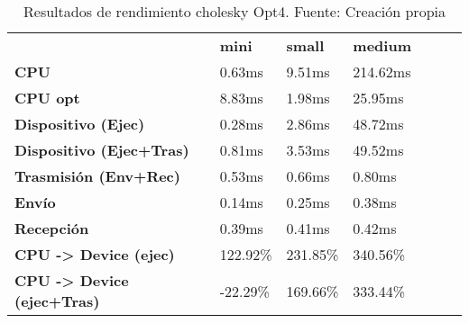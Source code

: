 \begin{table}[H]
    \centering
    \begin{tabular}{lllllll}
    \rowcolor[HTML]{DAE8FC} \ &  \textbf{mini} &  \textbf{	small} &  \textbf{	medium} \\
    \cellcolor[HTML]{DAE8FC} \textbf{CPU} & 0.63ms & 	9.51ms & 	214.62ms \\
    \rowcolor[HTML]{EFEFEF} \cellcolor[HTML]{DAE8FC} \textbf{CPU opt} & 8.83ms & 	1.98ms & 	25.95ms \\
    \cellcolor[HTML]{DAE8FC} \textbf{Dispositivo (Ejec)} & 0.28ms & 	2.86ms & 	48.72ms \\
    \rowcolor[HTML]{EFEFEF} \cellcolor[HTML]{DAE8FC} \textbf{Dispositivo (Ejec+Tras)} & 0.81ms & 	3.53ms & 	49.52ms \\
    \cellcolor[HTML]{DAE8FC} \textbf{Trasmisión (Env+Rec)} & 0.53ms & 	0.66ms & 	0.80ms \\
    \rowcolor[HTML]{EFEFEF} \cellcolor[HTML]{DAE8FC} \textbf{Envío} & 0.14ms & 	0.25ms & 	0.38ms \\
    \cellcolor[HTML]{DAE8FC} \textbf{Recepción} & 0.39ms & 	0.41ms & 	0.42ms \\
    \rowcolor[HTML]{EFEFEF} \cellcolor[HTML]{DAE8FC} \textbf{CPU -> Device (ejec)} & 122.92\% & 	231.85\% & 	340.56\% \\
    \cellcolor[HTML]{DAE8FC} \textbf{CPU -> Device (ejec+Tras)} & -22.29\% & 	169.66\% & 	333.44\% \\
    \end{tabular}
    \caption[Resultados de rendimiento cholesky Opt4]{{Resultados de rendimiento cholesky Opt4. Fuente: Creación propia}}
    \label{table_test_cholesky_Opt4_hw_performanceResults}
\end{table}